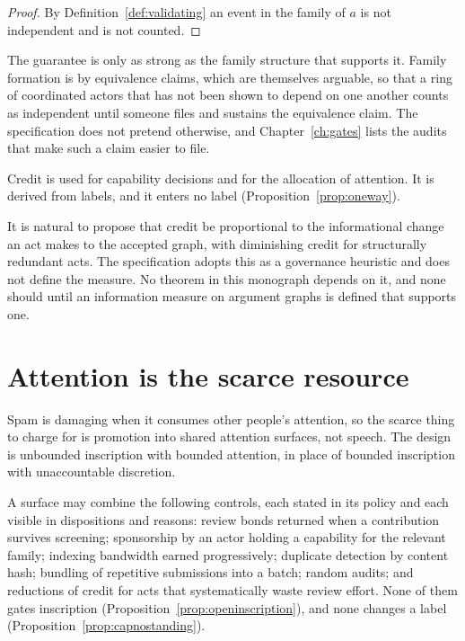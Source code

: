 \begin{proof}
By Definition~\ref{def:validating} an event in the family of $a$ is not independent and is not counted.
\end{proof}

The guarantee is only as strong as the family structure that supports it. Family formation is by equivalence claims, which are themselves arguable, so that a ring of coordinated actors that has not been shown to depend on one another counts as independent until someone files and sustains the equivalence claim. The specification does not pretend otherwise, and Chapter~\ref{ch:gates} lists the audits that make such a claim easier to file.

Credit is used for capability decisions and for the allocation of attention. It is derived from labels, and it enters no label (Proposition~\ref{prop:oneway}).

\begin{remark}\label{rem:redundant}
It is natural to propose that credit be proportional to the informational change an act makes to the accepted graph, with diminishing credit for structurally redundant acts. The specification adopts this as a governance heuristic and does not define the measure. No theorem in this monograph depends on it, and none should until an information measure on argument graphs is defined that supports one.
\end{remark}

\section{Attention is the scarce resource}\label{sec:attention}

Spam is damaging when it consumes other people's attention, so the scarce thing to charge for is promotion into shared attention surfaces, not speech. The design is unbounded inscription with bounded attention, in place of bounded inscription with unaccountable discretion.

\begin{designrule}\label{rule:attention}
A surface may combine the following controls, each stated in its policy and each visible in dispositions and reasons: review bonds returned when a contribution survives screening; sponsorship by an actor holding a capability for the relevant family; indexing bandwidth earned progressively; duplicate detection by content hash; bundling of repetitive submissions into a batch; random audits; and reductions of credit for acts that systematically waste review effort. None of them gates inscription (Proposition~\ref{prop:openinscription}), and none changes a label (Proposition~\ref{prop:capnostanding}).
\end{designrule}
